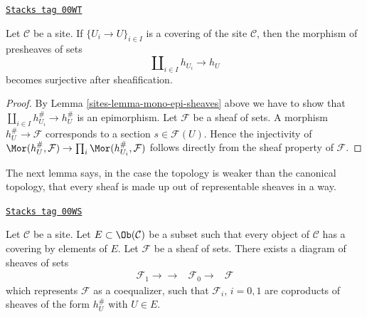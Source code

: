 \begin{lemma}
\label{sites-lemma-covering-surjective-after-sheafification}
\href{https://stacks.math.columbia.edu/tag/00WT}{\texttt{Stacks tag 00WT}}


Let $\mathcal{C}$ be a site. If
$\{U_i \to U\}_{i \in I}$ is a covering of the site
$\mathcal{C}$, then the morphism of presheaves of sets
$$
\coprod\nolimits_{i \in I} h_{U_i} \to h_U
$$
becomes surjective after sheafification.
\end{lemma}

\begin{proof}

By Lemma \ref{sites-lemma-mono-epi-sheaves} above we have to show that
$\coprod\nolimits_{i \in I} h_{U_i}^\# \to h_U^\#$
is an epimorphism. Let $\mathcal{F}$ be a sheaf of sets.
A morphism $h_U^\# \to \mathcal{F}$
corresponds to a section $s \in \mathcal{F}(U)$.
Hence the injectivity of $\Mor(h_U^\#, \mathcal{F})
\to \prod_i \Mor(h_{U_i}^\#, \mathcal{F})$ follows
directly from the sheaf property of $\mathcal{F}$.
\end{proof}

The next lemma says, in the case the topology is weaker than the
canonical topology, that every sheaf is made up out of
representable sheaves in a way.

\begin{lemma}
\label{sites-lemma-sheaf-coequalizer-representable}
\href{https://stacks.math.columbia.edu/tag/00WS}{\texttt{Stacks tag 00WS}}

Let $\mathcal{C}$ be a site. Let $E \subset \Ob(\mathcal{C})$ be a
subset such that every object of $\mathcal{C}$ has a covering by
elements of $E$. Let $\mathcal{F}$ be a sheaf of sets. There exists a
diagram of sheaves of sets
$$
\begin{array}{ccc}\mathcal{F}_1 \longrightarrow\longrightarrow & \mathcal{F}_0 \longrightarrow & \mathcal{F}\end{array}
$$
which represents $\mathcal{F}$ as a coequalizer,
such that $\mathcal{F}_i$, $i = 0, 1$ are coproducts
of sheaves of the form $h_U^\#$ with $U \in E$.
\end{lemma}

